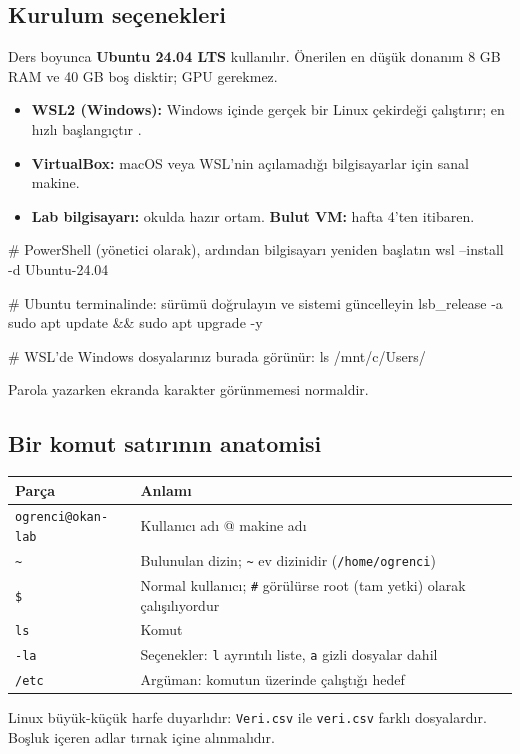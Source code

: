 \documentclass[11pt,a4paper]{article}
\begin{document}
\subsection{Kurulum seçenekleri}
Ders boyunca \textbf{Ubuntu 24.04 LTS} kullanılır. Önerilen en düşük donanım 8 GB RAM ve 40 GB boş disktir; GPU gerekmez.
\begin{itemize}
  \item \textbf{WSL2 (Windows):} Windows içinde gerçek bir Linux çekirdeği çalıştırır; en hızlı başlangıçtır \cite{wsl}.
  \item \textbf{VirtualBox:} macOS veya WSL'nin açılamadığı bilgisayarlar için sanal makine.
  \item \textbf{Lab bilgisayarı:} okulda hazır ortam. \textbf{Bulut VM:} hafta 4'ten itibaren.
\end{itemize}

\begin{kodblok}
# PowerShell (yönetici olarak), ardından bilgisayarı yeniden başlatın
wsl --install -d Ubuntu-24.04

# Ubuntu terminalinde: sürümü doğrulayın ve sistemi güncelleyin
lsb_release -a
sudo apt update && sudo apt upgrade -y

# WSL'de Windows dosyalarınız burada görünür:
ls /mnt/c/Users/
\end{kodblok}
Parola yazarken ekranda karakter görünmemesi normaldir.

\subsection{Bir komut satırının anatomisi}
\begin{center}
\begin{tabularx}{\textwidth}{@{}l Y@{}}
\toprule
\textbf{Parça} & \textbf{Anlamı} \\
\midrule
\texttt{ogrenci@okan-lab} & Kullanıcı adı @ makine adı \\
\texttt{\textasciitilde} & Bulunulan dizin; \texttt{\textasciitilde} ev dizinidir (\texttt{/home/ogrenci}) \\
\texttt{\$} & Normal kullanıcı; \texttt{\#} görülürse root (tam yetki) olarak çalışılıyordur \\
\texttt{ls} & Komut \\
\texttt{-la} & Seçenekler: \texttt{l} ayrıntılı liste, \texttt{a} gizli dosyalar dahil \\
\texttt{/etc} & Argüman: komutun üzerinde çalıştığı hedef \\
\bottomrule
\end{tabularx}
\end{center}
Linux büyük-küçük harfe duyarlıdır: \texttt{Veri.csv} ile \texttt{veri.csv} farklı dosyalardır. Boşluk içeren adlar tırnak içine alınmalıdır.
\end{document}
